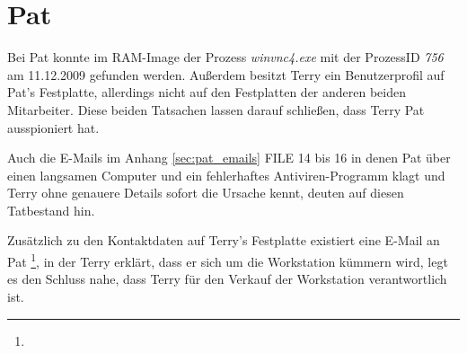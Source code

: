 \section{Pat}
\label{sec:pat}
Bei Pat konnte im RAM-Image der Prozess \textit{winvnc4.exe} mit der ProzessID \textit{756} am 11.12.2009 gefunden werden. Außerdem besitzt Terry ein Benutzerprofil auf Pat's Festplatte, allerdings nicht auf den Festplatten der anderen beiden Mitarbeiter. Diese beiden Tatsachen lassen darauf schließen, dass Terry Pat ausspioniert hat.

Auch die E-Mails im Anhang \ref{sec:pat_emails} FILE 14 bis 16 in denen Pat über einen langsamen Computer und ein fehlerhaftes Antiviren-Programm klagt und Terry ohne genauere Details sofort die Ursache kennt, deuten auf diesen Tatbestand hin.\newline

Zusätzlich zu den Kontaktdaten auf Terry's Festplatte existiert eine E-Mail an Pat
\footnote{}, in der Terry erklärt, dass er sich um die Workstation kümmern wird, legt es den Schluss nahe, dass Terry für den Verkauf der Workstation verantwortlich ist.

